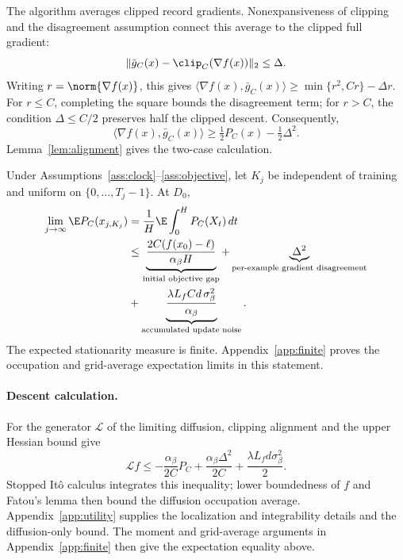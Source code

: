 The algorithm averages clipped record gradients. Nonexpansiveness of
clipping and the disagreement assumption connect this average to the
clipped full gradient:
\[
 \|\bar g_C(x)-\clip_C(\nabla f(x))\|_2\leq\Delta.
\]
Writing $r=\norm{\nabla f(x)}$, this gives
$\langle\nabla f(x),\bar g_C(x)\rangle\geq\min\{r^2,Cr\}-\Delta r$.
For $r\leq C$, completing the square bounds the disagreement term; for
$r>C$, the condition $\Delta\leq C/2$ preserves half the clipped descent.
Consequently,
\[
 \boxed{\langle\nabla f(x),\bar g_C(x)\rangle
       \geq\tfrac12P_C(x)-\tfrac12\Delta^2.}
\]
Lemma~\ref{lem:alignment} gives the two-case calculation.

\begin{theorem}\label{cor:finite}
Under Assumptions~\ref{ass:clock}--\ref{ass:objective}, let $K_j$ be
independent of training and uniform on $\{0,\ldots,T_j-1\}$. At $D_0$,
\begin{equation}\label{eq:finite-rate}
\begin{aligned}
 \lim_{j\to\infty}\E P_C(x_{j,K_j})
 &=\frac1H\E\int_0^H P_C(X_t)\,dt\\
 &\leq
 \underbrace{\frac{2C(f(x_0)-\ell)}{\alpha_\beta H}}
 _{\text{initial objective gap}}
 +\underbrace{\Delta^2}_{\text{per-example gradient disagreement}}\\
 &+\underbrace{\frac{\lambda L_fCd\,\sigma_\beta^2}{\alpha_\beta}}
 _{\text{accumulated update noise}}.
\end{aligned}
\end{equation}
The expected stationarity measure is finite. Appendix~\ref{app:finite} proves the
occupation and grid-average expectation limits in this statement.
\end{theorem}

\paragraph{Descent calculation.}
For the generator $\mathcal L$ of the limiting diffusion, clipping
alignment and the upper Hessian bound give
\[
 \mathcal Lf
 \leq-\frac{\alpha_\beta}{2C}P_C
       +\frac{\alpha_\beta\Delta^2}{2C}
       +\frac{\lambda L_fd \sigma_\beta^2}{2}.
\]
Stopped It\^o calculus integrates this inequality; lower boundedness of
$f$ and Fatou's lemma then bound the diffusion occupation average.
Appendix~\ref{app:utility} supplies the localization and integrability
details and the diffusion-only bound. The moment and grid-average
arguments in Appendix~\ref{app:finite} then give the expectation equality above.


